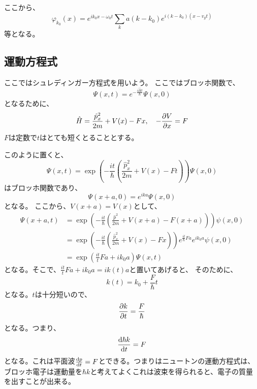 \documentclass[titlepage]{ltjsarticle}
\begin{document}
ここから、
\begin{equation}
  \varphi_{k_0}(x) = e^{ik_0x - \omega_0 t} \sum_k a(k-k_0) e^{i(k-k_0)(x-v_g t)}
\end{equation}
等となる。

\subsection{運動方程式}
ここではシュレディンガー方程式を用いよう。
ここではブロッホ関数で、
\begin{equation}
  \Psi(x,t) = e^{-\frac{i \hat{H}t}{\hbar}}\Psi(x,0)
\end{equation}
となるために、
\begin{equation}
  \hat{H} = \frac{\hat{p}_x^2}{2m} + V(x) - Fx ,\quad - \pdv{V}{x} = F 
\end{equation}
\(F\)は定数で\(t\)はとても短くとることとする。

このように置くと、
\begin{equation}
  \Psi(x,t) = \exp\left( - \frac{it}{\hbar} \left( \frac{\hat{p}_x^2}{2m} + V(x) -Ft \right) \right)\Psi(x,0)
\end{equation}
はブロッホ関数であり、
\begin{equation}
  \Psi(x+a,0) = e^{ika}\Psi(x,0)
\end{equation}
となる。
ここから、\(V(x+a)=V(x)\)として、
\begin{align}
  \Psi(x+a,t) & = \exp \left( -\frac{it}{\hbar} \left( \frac{\hat{p}^2}{2m} + V(x+a) -F(x+a) \right)\right)\psi(x,0) \\
  & = \exp \left( -\frac{it}{\hbar} \left( \frac{\hat{p}^2_x}{2m} +V(x) -Fx \right) \right)e^{\frac{i t}{\hbar}Fa} e^{ik_0a}\psi(x,0)\\
  & = \exp\left( \frac{it}{t}Fa + ik_0a \right)\Psi(x,t)
\end{align}
となる。そこで、\(\frac{it}{t}Fa + ik_0a = ik(t)a\)と置いてあげると、
そのために、
\begin{equation}
  k(t) = k_0 + \frac{F}{\hbar}t 
\end{equation}
となる。\(t\)は十分短いので、
\begin{equation}
  \pdv{k}{t} = \frac{F}{\hbar}
\end{equation}
となる。つまり、
\begin{equation}
  \odv{\hbar k}{t} = F 
\end{equation}
となる。これは平面波\(\odv{p}{t} = F\)とできる。つまりはニュートンの運動方程式は、ブロッホ電子は運動量を\(\hbar k\)と考えてよくこれは波束を得られると、電子の質量を出すことが出来る。
\end{document}
